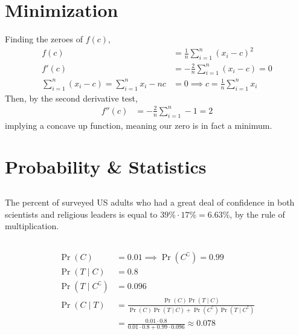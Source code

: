 \documentclass{article}
\begin{document}
\section{Minimization}

Finding the zeroes of \(f(c)\),
\begin{align}
    f(c) &= \frac{1}{n} \sum_{i = 1}^n (x_i - c)^2 \\
    f'(c) &= -\frac{2}{n} \sum_{i = 1}^n (x_i - c) = 0 \\
    \sum_{i = 1}^n (x_i - c) = \sum_{i = 1}^n x_i - nc &= 0 \implies c = \frac{1}{n} \sum_{i = 1}^n x_i
\end{align}
Then, by the second derivative test,
\begin{align}
    f''(c) &= -\frac{2}{n} \sum_{i = 1}^n -1 = 2
\end{align}
implying a concave up function, meaning our zero is in fact a minimum.

\section{Probability \& Statistics}

\subsection{}

The percent of surveyed US adults who had a great deal of confidence in both scientists and religious leaders is equal to \(39\% \cdot 17\% = 6.63\%\), by the rule of multiplication.


\subsection{}

\begin{align}
    \Pr(C) &= 0.01 \implies \Pr(C^\complement) = 0.99 \\
    \Pr(T \mid C) &= 0.8 \\
    \Pr(T \mid C^\complement) &= 0.096 \\
    \Pr(C \mid T) &= \frac{\Pr(C) \Pr(T \mid C)}{\Pr(C) \Pr(T \mid C) + \Pr(C^\complement) \Pr(T \mid C^\complement)} \\
    &= \frac{0.01 \cdot 0.8}{0.01 \cdot 0.8 + 0.99 \cdot 0.096} \approx 0.078
\end{align}

\subsection{}
\end{document}
